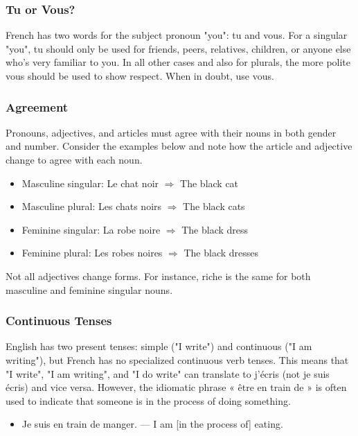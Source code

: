 \subsubsection{Tu or Vous?}

French has two words for the subject pronoun "you": tu and vous. For a singular "you", tu should only be used for friends, peers, relatives, children, or anyone else who's very familiar to you. In all other cases and also for plurals, the more polite vous should be used to show respect. When in doubt, use vous.

\subsubsection{Agreement}

Pronouns, adjectives, and articles must agree with their nouns in both gender and number. Consider the examples below and note how the article and adjective change to agree with each noun.

\begin{itemize}
  \item  Masculine singular: Le chat noir $\Rightarrow$ The black cat
  \item  Masculine plural: Les chats noirs $\Rightarrow$ The black cats
  \item  Feminine singular: La robe noire $\Rightarrow$ The black dress
  \item  Feminine plural: Les robes noires $\Rightarrow$ The black dresses
\end{itemize}

Not all adjectives change forms. For instance, riche is the same for both masculine and feminine singular nouns.

\subsubsection{Continuous Tenses}

English has two present tenses: simple ("I write") and continuous ("I am writing"), but French has no specialized continuous verb tenses. This means that "I write", "I am writing", and "I do write" can translate to j'écris (not je suis écris) and vice versa.  However, the idiomatic phrase « être en train de » is often used to indicate that someone is in the process of doing something.

\begin{itemize}
  \item  Je suis en train de manger. — I am [in the process of] eating.
\end{itemize}
    

